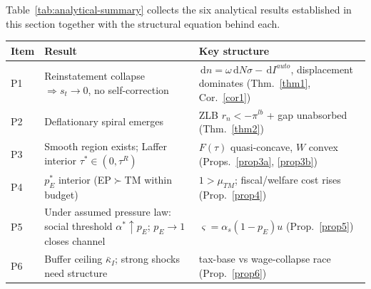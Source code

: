 \documentclass[review,12pt]{elsarticle}
\theoremstyle{plain}
\theoremstyle{definition}
\theoremstyle{remark}
\newcommand{\dd}{\,\mathrm{d}}
\begin{document}
Table~\ref{tab:analytical-summary} collects the six analytical results established in this section together with the structural equation behind each.
\begin{center}
\small
{}\label{tab:analytical-summary}
\begin{tabular}{@{}>{\raggedright\arraybackslash}p{0.45in}>{\raggedright\arraybackslash}p{2.1in}>{\raggedright\arraybackslash}p{3.3in}@{}}\toprule
Item & Result & Key structure \\
\midrule
P1 & Reinstatement collapse $\Rightarrow s_t\to0$, no self-correction & $\dd n=\omega\dd N\sigma-\dd I^{auto}$, displacement dominates (Thm.~\ref{thm1}, Cor.~\ref{cor1}) \\
P2 & Deflationary spiral emerges & ZLB $r_n<-\pi^{lb}$ + gap unabsorbed (Thm.~\ref{thm2}) \\
P3 & Smooth region exists; Laffer interior $\tau^*\in(0,\tau^R)$ & $F(\tau)$ quasi-concave, $W$ convex (Props.~\ref{prop3a}, \ref{prop3b}) \\
P4 & $p_E^*$ interior (EP$\succ$TM within budget) & $1>\mu_{TM}$; fiscal/welfare cost rises (Prop.~\ref{prop4}) \\
P5 & Under assumed pressure law: social threshold $\alpha^*\uparrow p_E$; $p_E\to1$ closes channel & $\varsigma=\alpha_s(1-p_E)u$ (Prop.~\ref{prop5}) \\
P6 & Buffer ceiling $\bar\kappa_I$; strong shocks need structure & tax-base vs wage-collapse race (Prop.~\ref{prop6}) \\
\bottomrule
\end{tabular}
\end{center}

\end{document}
